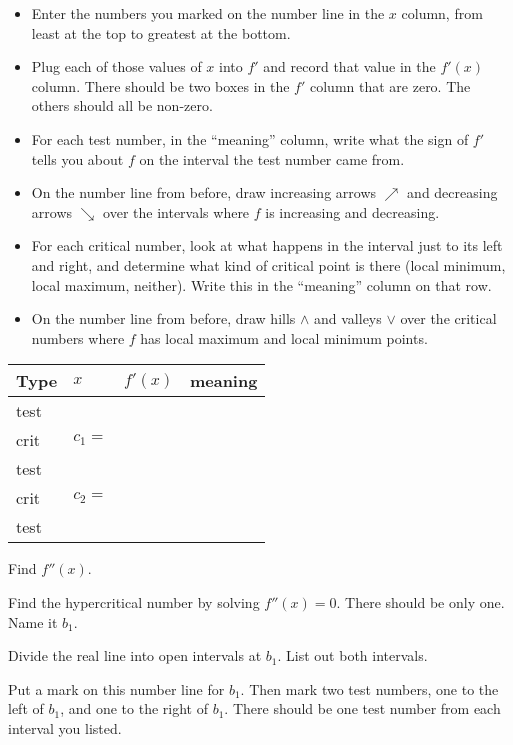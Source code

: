 \begin{ProblemSet}
 \begin{Problem}[pencil space=0in]
  \begin{itemize}
  \item Enter the numbers you marked on the number line in the $x$ column, from least at the top to greatest at the bottom.
  \item Plug each of those values of $x$ into $f'$ and record that value in the $f'(x)$ column.
   There should be two boxes in the $f'$ column that are zero.
   The others should all be non-zero.
  \item For each test number, in the ``meaning'' column, write what the sign of $f'$ tells you about $f$ on the interval the test number came from.
  \item On the number line from before, draw increasing arrows $\nearrow$ and decreasing arrows $\searrow$ over the intervals where $f$ is increasing and decreasing.
  \item For each critical number, look at what happens in the interval just to its left and right, and determine what kind of critical point is there (local minimum, local maximum, neither).
   Write this in the ``meaning'' column on that row.
  \item On the number line from before, draw hills $\wedge$ and valleys $\vee$ over the critical numbers where $f$ has local maximum and local minimum points.
  \end{itemize}
  \bigskip

  \newcommand{\Bx}[1]{\Strut[-0.25in]{0.75in}#1}
  \begin{tabular}{l|p{1in}|p{1in}|p{3in}}
    Type & $x$ & $f'(x)$ & meaning
    \\ \hline
    \Bx{test} & & &
    \\ \hline
    \Bx{crit} & \Bx{$c_1 = $} & &
    \\ \hline
    \Bx{test} & & &
    \\ \hline
    \Bx{crit} & \Bx{$c_2 = $} & &
    \\ \hline
    \Bx{test} & & &
    \\ \hline
  \end{tabular}
 \end{Problem}

 \begin{Problem}
  Find $f''(x)$.
 \end{Problem}
 \begin{Problem}
  Find the hypercritical number by solving $f''(x)=0$.
  There should be only one.
  Name it $b_1$.
 \end{Problem}
 \begin{Problem}
  Divide the real line into open intervals at $b_1$.
  List out both intervals.
 \end{Problem}
 \begin{Problem}[pencil space=0in]
  Put a mark on this number line for $b_1$.
  Then mark two test numbers, one to the left of $b_1$,
  and one to the right of $b_1$.
  There should be one test number from each interval you listed.


\end{Problem}
\end{ProblemSet}

